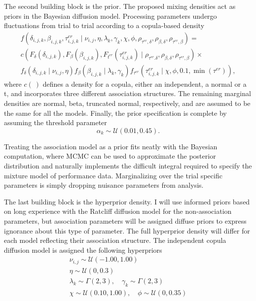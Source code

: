 \documentclass[12pt]{article}
\begin{document}
	The second building block is the prior. The proposed mixing densities act as priors in the Bayesian diffusion model. Processing parameters undergo fluctuations from trial to trial according to a copula-based density
\begin{eqnarray}
f(\delta_{i,j,k},\beta_{i,j,k},\tau_{i,j,k}^{er} \mid \nu_{i,j},\eta,\lambda_k,\gamma_k,\chi,\phi,\rho_{\tau^{er},\delta},\rho_{\beta,\delta},\rho_{\tau^{er},\beta}) = \nonumber \\
c(F_{\delta}(\delta_{i,j,k}),F_{\beta}(\beta_{i,j,k}),F_{t^{er}}(\tau_{i,j,k}^{er}) \mid \rho_{\tau^{er}.\delta}, \rho_{\beta,\delta},\rho_{\tau^{er},\beta}) \times \nonumber \\
f_{\delta}(\delta_{i,j,k} \mid \nu_{i,j}, \eta)f_{\beta}(\beta_{i,j,k} \mid \lambda_k,\gamma_k)f_{\tau^{er}}(\tau_{i,j,k}^{er} \mid \chi, \phi, 0.1, \operatorname{min}(\tau^{er})),
\end{eqnarray}
where $c(\:)$ defines a density for a copula, either an independent, a normal or a t, and incorporates three different association structures. The remaining marginal densities are normal, beta, truncated normal, respectively, and are assumed to be the same for all the models. Finally, the prior specification is complete by assuming the threshold parameter
\begin{equation}
\alpha_k \sim \mathcal{U}(0.01, 0.45).
\end{equation}

	Treating the association model as a prior fits neatly with the Bayesian computation, where MCMC can be used to approximate the posterior distribution and naturally implements the difficult integral required to specify the mixture model of performance data. Marginalizing over the trial specific parameters is simply dropping nuisance parameters from analysis.
    
	The last building block is the hyperprior density. I will use informed priors based on long experience with the Ratcliff diffusion model \citep{MatWag2009} for the non-association parameters, but association parameters will be assigned diffuse priors to express ignorance about this type of parameter. The full hyperprior density will differ for each model reflecting their association structure. The independent copula diffusion model is assigned the following hyperpriors
\begin{gather}
\nu_{i,j} \sim \mathcal{U}(-1.00, 1.00) \nonumber \\
\eta \sim \mathcal{U}(0, 0.3) \nonumber \\
\lambda_k \sim \Gamma(2, 3), \quad \gamma_k \sim \Gamma(2, 3) \nonumber \\
\chi \sim \mathcal{U}(0.10, 1.00), \quad \phi \sim \mathcal{U}(0, 0.35)
\end{gather}
\end{document}
